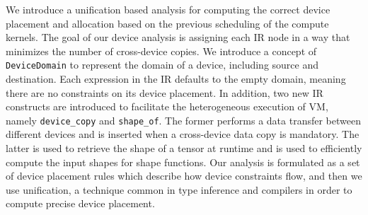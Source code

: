 We introduce a unification based analysis for computing the correct device placement and allocation based on the previous scheduling of the compute kernels. The goal of our device analysis is assigning each IR node in a way that minimizes the number of cross-device copies. We introduce a concept of \texttt{DeviceDomain} to represent the domain of a device, including source and destination. Each expression in the IR defaults to the empty domain, meaning there are no constraints on its device placement. In addition, two new IR constructs are introduced to facilitate the heterogeneous execution of VM, namely \verb|device_copy| and \verb|shape_of|. The former performs a data transfer between different devices and is inserted when a cross-device data copy is mandatory. The latter is used to retrieve the shape of a tensor at runtime and is used to efficiently compute the input shapes for shape functions. Our analysis is formulated as a set of device placement rules which describe how device constraints flow, and then we use unification, a technique common in type inference and compilers in order to compute precise device placement.


